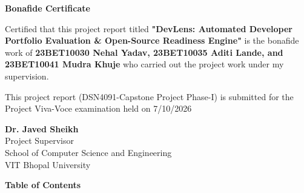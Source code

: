 \documentclass[12pt,a4paper]{article}
\begin{document}
\newpage
\thispagestyle{fancy}
\begin{center}
    {\fontsize{14pt}{16pt}\bfseries Bonafide Certificate \par}
\end{center}

\vspace{1.5cm}

\noindent Certified that this project report titled \textbf{"DevLens: Automated Developer Portfolio Evaluation \& Open-Source Readiness Engine"} is the bonafide work of \textbf{23BET10030 Nehal Yadav, 23BET10035 Aditi Lande, and 23BET10041 Mudra Khuje} who carried out the project work under my supervision.

\vspace{1.5cm}

\noindent This project report (DSN4091-Capstone Project Phase-I) is submitted for the Project Viva-Voce examination held on 7/10/2026

\vspace{5.0cm}

\begin{flushright}
    \textbf{Dr. Javed Sheikh} \\
    Project Supervisor \\
    School of Computer Science and Engineering \\
    VIT Bhopal University
\end{flushright}

\newpage
\thispagestyle{fancy}
\begin{center}
    {\fontsize{14pt}{16pt}\bfseries Table of Contents \par}
\end{center}
\vspace{0.5cm}
\end{document}
